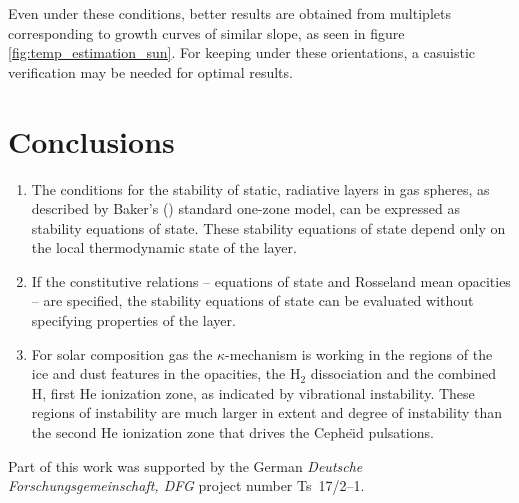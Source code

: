 \documentclass{aa}
\begin{document}
Even under these conditions, better results are obtained from multiplets corresponding
to growth curves of similar slope, as seen in figure
\ref{fig:temp_estimation_sun}. For keeping under these orientations, a casuistic
verification may be needed for optimal results.

\section{Conclusions}

   \begin{enumerate}
      \item The conditions for the stability of static, radiative
         layers in gas spheres, as described by Baker's (\citeyear{baker})
         standard one-zone model, can be expressed as stability
         equations of state. These stability equations of state depend
         only on the local thermodynamic state of the layer.
      \item If the constitutive relations -- equations of state and
         Rosseland mean opacities -- are specified, the stability
         equations of state can be evaluated without specifying
         properties of the layer.
      \item For solar composition gas the $\kappa$-mechanism is
         working in the regions of the ice and dust features
         in the opacities, the $\mathrm{H}_2$ dissociation and the
         combined H, first He ionization zone, as
         indicated by vibrational instability. These regions
         of instability are much larger in extent and degree of
         instability than the second He ionization zone
         that drives the Cephe{\"\i}d pulsations.
   \end{enumerate}

\begin{acknowledgements}
      Part of this work was supported by the German
      \emph{Deut\-sche For\-schungs\-ge\-mein\-schaft, DFG\/} project
      number Ts~17/2--1.
\end{acknowledgements}

%
%



\end{document}
